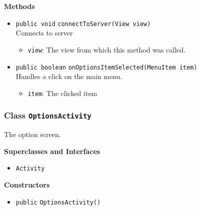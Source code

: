 \textbf{Methods}
\begin{itemize}
\item \lstinline|public void| \lstinline|connectToServer|\lstinline|(View view)|\\
Connects to server
\begin{itemize}
\item \lstinline|view|: The view from which this method was called.
\end{itemize}



\item \lstinline|public boolean| \lstinline|onOptionsItemSelected|\lstinline|(MenuItem item)|\\
Handles a click on the main menu.
\begin{itemize}
\item \lstinline|item|: The clicked item
\end{itemize}



\end{itemize}

\subsubsection{Class \lstinline|OptionsActivity|}
The option screen. \\



\textbf{Superclasses and Interfaces}
\begin{itemize}
\item \lstinline|Activity|
\end{itemize}



\textbf{Constructors}
\begin{itemize}
\item \lstinline|public| \lstinline|OptionsActivity|\lstinline|()|




\end{itemize}


